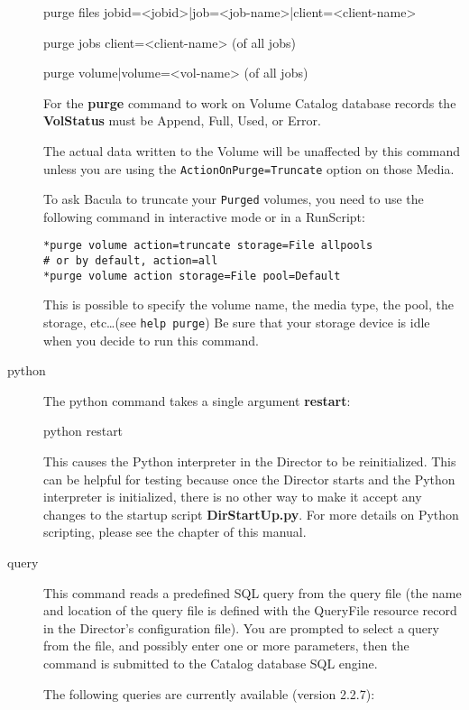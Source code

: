 \begin{description}
purge files jobid={\textless}jobid{\textgreater}|job={\textless}job-name{\textgreater}|client={\textless}client-name{\textgreater}

purge jobs client={\textless}client-name{\textgreater} (of all jobs)

purge volume|volume={\textless}vol-name{\textgreater} (of all jobs)

For the {\bf purge} command to work on Volume Catalog database  records the
{\bf VolStatus}  must be Append, Full, Used, or Error.

The actual data written to the Volume will be unaffected by this command unless
you are using the \texttt{ActionOnPurge=Truncate} option on those Media.

To ask Bacula to truncate your \texttt{Purged} volumes, you need to use the
following command in interactive mode or in a RunScript:
\begin{verbatim}
*purge volume action=truncate storage=File allpools
# or by default, action=all
*purge volume action storage=File pool=Default
\end{verbatim}

This is possible to specify the volume name, the media type, the pool, the
storage, etc\dots (see \texttt{help purge}) Be sure that your storage device is
idle when you decide to run this command.

\item[python]
  The python command takes a single argument {\bf restart}:

python restart

   This causes the Python interpreter in the Director to be reinitialized.
   This can be helpful for testing because once the Director starts and the
   Python interpreter is initialized, there is no other way to make it
   accept any changes to the startup script {\bf DirStartUp.py}.  For more
   details on Python scripting, please see the  chapter of this manual.

\item [query]
   This command reads a predefined SQL query from  the query file (the name and
   location of the  query file is defined with the QueryFile resource record in
   the Director's configuration file). You are prompted to select  a query from
   the file, and possibly enter one or more parameters,  then the command is
   submitted to the Catalog database SQL engine.

The following queries are currently available (version 2.2.7):


\end{description}
